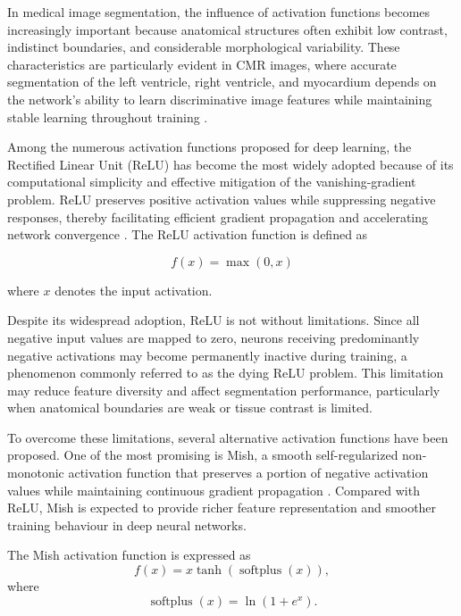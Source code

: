 In medical image segmentation, the influence of activation functions becomes increasingly important because anatomical structures often exhibit low contrast, indistinct boundaries, and considerable morphological variability. These characteristics are particularly evident in CMR images, where accurate segmentation of the left ventricle, right ventricle, and myocardium depends on the network's ability to learn discriminative image features while maintaining stable learning throughout training \citep{Chen2020Review,Hesamian2019}.

Among the numerous activation functions proposed for deep learning, the Rectified Linear Unit (ReLU) has become the most widely adopted because of its computational simplicity and effective mitigation of the vanishing-gradient problem. ReLU preserves positive activation values while suppressing negative responses, thereby facilitating efficient gradient propagation and accelerating network convergence \citep{Nair2010}. The ReLU activation function is defined as

\begin{equation}
	f(x)=\max(0,x)
	\label{eq:relu}
\end{equation}

where $x$ denotes the input activation.

Despite its widespread adoption, ReLU is not without limitations. Since all negative input values are mapped to zero, neurons receiving predominantly negative activations may become permanently inactive during training, a phenomenon commonly referred to as the dying ReLU problem. This limitation may reduce feature diversity and affect segmentation performance, particularly when anatomical boundaries are weak or tissue contrast is limited.

To overcome these limitations, several alternative activation functions have been proposed. One of the most promising is Mish, a smooth self-regularized non-monotonic activation function that preserves a portion of negative activation values while maintaining continuous gradient propagation \citep{Misra2020}. Compared with ReLU, Mish is expected to provide richer feature representation and smoother training behaviour in deep neural networks.

The Mish activation function is expressed as
\begin{equation}
	f(x) = x \tanh\left(\operatorname{softplus}(x)\right),
	\label{eq:mish}
\end{equation}%
where
\begin{equation}
	\operatorname{softplus}(x) = \ln(1+e^x).
	\label{eq:softplus}
\end{equation}

